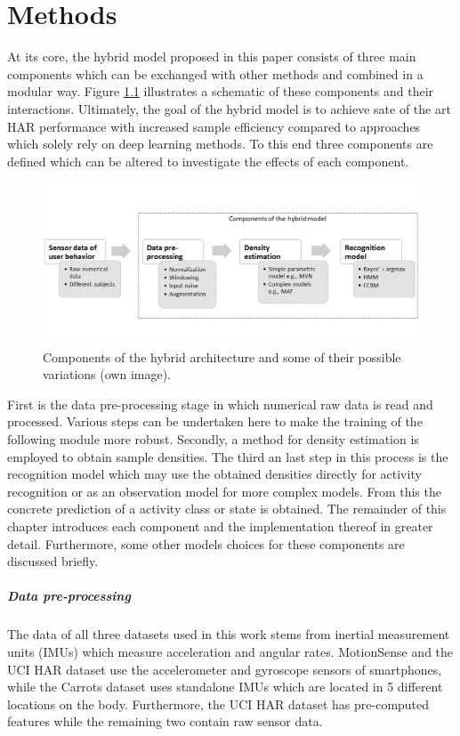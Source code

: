 \documentclass[11pt,titlepage,oneside,openany]{book}
\begin{document}
\chapter{Methods}
\label{cha:alg}

At its core, the hybrid model proposed in this paper consists of three main components which can be exchanged with other methods and combined in a modular way. Figure \ref{fig:schema} illustrates a schematic of these components and their interactions. Ultimately, the goal of the hybrid model is to achieve sate of the art HAR performance with increased sample efficiency compared to approaches which solely rely on deep learning methods. To this end three components are defined which can be altered to investigate the effects of each component.

\begin{figure}[h]
	\centering
	\includegraphics[width=\linewidth]{Hybrid_schmeatic.jpg}
	\caption[Hybrid architecture components]{Components of the hybrid architecture and some of their possible variations (own image).}
	\label{fig:schema}
\end{figure}

\noindent First is the data pre-processing stage in which numerical raw data is read and processed. Various steps can be undertaken here to make the training of the following module more robust. Secondly, a method for density estimation is employed to obtain sample densities. The third an last step in this process is the recognition model which may use the obtained densities directly for activity recognition or as an observation model for more complex models. From this the concrete prediction of a activity class or state is obtained. The remainder of this chapter introduces each component and the implementation thereof in greater detail. Furthermore, some other models choices for these components are discussed briefly.

\paragraph{Data pre-processing}
The data of all three datasets used in this work stems from inertial measurement units (IMUs) which measure acceleration and angular rates. MotionSense \cite{malekzadeh_mobile_2019} and the UCI HAR \cite{anguita_public_2013} dataset use the accelerometer and gyroscope sensors of smartphones, while the Carrots dataset \cite{kruger_recognising_2011} uses standalone IMUs which are located in 5 different locations on the body. Furthermore, the UCI HAR dataset has pre-computed features while the remaining two contain raw sensor data.
\end{document}
